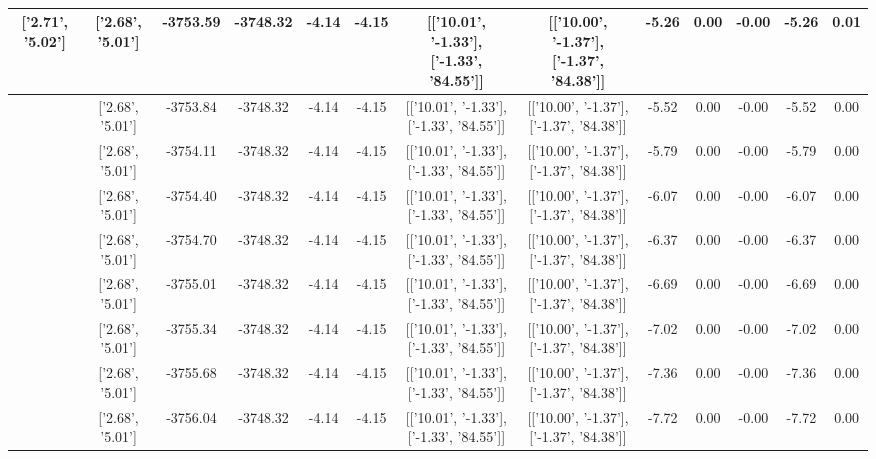 \begin{table}[htbp]
\begin{adjustbox}{angle=90}
\begin{tabular}{|c|c|c|c|c|c|c|c|c|c|c|c|c|}
 ['2.71', '5.02'] & ['2.68', '5.01'] & -3753.59 & -3748.32 & -4.14 & -4.15 & [['10.01', '-1.33'], ['-1.33', '84.55']] & [['10.00', '-1.37'], ['-1.37', '84.38']] & -5.26 & 0.00 & -0.00 & -5.26 & 0.01\\ \hline
 ['2.71', '5.02'] & ['2.68', '5.01'] & -3753.84 & -3748.32 & -4.14 & -4.15 & [['10.01', '-1.33'], ['-1.33', '84.55']] & [['10.00', '-1.37'], ['-1.37', '84.38']] & -5.52 & 0.00 & -0.00 & -5.52 & 0.00\\ \hline
 ['2.71', '5.02'] & ['2.68', '5.01'] & -3754.11 & -3748.32 & -4.14 & -4.15 & [['10.01', '-1.33'], ['-1.33', '84.55']] & [['10.00', '-1.37'], ['-1.37', '84.38']] & -5.79 & 0.00 & -0.00 & -5.79 & 0.00\\ \hline
 ['2.71', '5.02'] & ['2.68', '5.01'] & -3754.40 & -3748.32 & -4.14 & -4.15 & [['10.01', '-1.33'], ['-1.33', '84.55']] & [['10.00', '-1.37'], ['-1.37', '84.38']] & -6.07 & 0.00 & -0.00 & -6.07 & 0.00\\ \hline
 ['2.71', '5.02'] & ['2.68', '5.01'] & -3754.70 & -3748.32 & -4.14 & -4.15 & [['10.01', '-1.33'], ['-1.33', '84.55']] & [['10.00', '-1.37'], ['-1.37', '84.38']] & -6.37 & 0.00 & -0.00 & -6.37 & 0.00\\ \hline
 ['2.71', '5.02'] & ['2.68', '5.01'] & -3755.01 & -3748.32 & -4.14 & -4.15 & [['10.01', '-1.33'], ['-1.33', '84.55']] & [['10.00', '-1.37'], ['-1.37', '84.38']] & -6.69 & 0.00 & -0.00 & -6.69 & 0.00\\ \hline
 ['2.71', '5.02'] & ['2.68', '5.01'] & -3755.34 & -3748.32 & -4.14 & -4.15 & [['10.01', '-1.33'], ['-1.33', '84.55']] & [['10.00', '-1.37'], ['-1.37', '84.38']] & -7.02 & 0.00 & -0.00 & -7.02 & 0.00\\ \hline
 ['2.71', '5.02'] & ['2.68', '5.01'] & -3755.68 & -3748.32 & -4.14 & -4.15 & [['10.01', '-1.33'], ['-1.33', '84.55']] & [['10.00', '-1.37'], ['-1.37', '84.38']] & -7.36 & 0.00 & -0.00 & -7.36 & 0.00\\ \hline
 ['2.72', '5.02'] & ['2.68', '5.01'] & -3756.04 & -3748.32 & -4.14 & -4.15 & [['10.01', '-1.33'], ['-1.33', '84.55']] & [['10.00', '-1.37'], ['-1.37', '84.38']] & -7.72 & 0.00 & -0.00 & -7.72 & 0.00\\ \hline
            \end{tabular}
        \end{adjustbox}
        \caption{}
        \label{}
    \end{table}
    